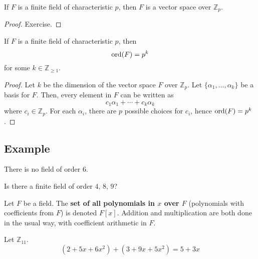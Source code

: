 \begin{thmbox}
    \begin{theorem}
    If $ F $ is a finite field of characteristic $ p $, then $ F $
    is a vector space over $ \mathbb{Z}_p $.
\end{theorem} \end{thmbox}

\begin{proof}
    Exercise.
\end{proof}

\begin{thmbox}
    \begin{theorem}
    If $ F $ is a finite field of characteristic $ p $, then
    \[ \operatorname{ord}(F)=p^k \]
    for some $ k\in\mathbb{Z}_{\geqslant 1} $.
\end{theorem} \end{thmbox}

\begin{proof}
    Let $ k $ be the dimension of the vector space $ F $ over $ \mathbb{Z}_p $.
    Let $ \{\alpha_1,\ldots ,\alpha_k\} $ be a basis for $ F $. Then, every element
    in $ F $ can be written as
    \[ c_1\alpha_1+\cdots+c_k\alpha_k \]
    where $ c_i\in\mathbb{Z}_p $. For each $ \alpha_i $, there are $ p $
    possible choices for $ c_i $, hence $ \operatorname{ord}(F)=p^k $.
\end{proof}

\begin{exbox}
    \subsection{Example}
    There is no field of order $ 6 $.
\end{exbox}

 Is there a finite field of order $ 4,\,8,\,9 $?

\begin{defbox}
    \begin{definition}
    Let $ F $ be a field. The \textbf{set of all polynomials in $ x $ over $ F $}
    (polynomials with coefficients from $ F $) is denoted $ F[x] $. Addition
    and multiplication are both done in the usual way, with coefficient arithmetic
    in $ F $.
\end{definition} \end{defbox}

\begin{exbox}
    Let $ \mathbb{Z}_{11} $.
    \[ (2+5x+6x^2)+(3+9x+5x^2)=5+3x \]
\end{exbox}

